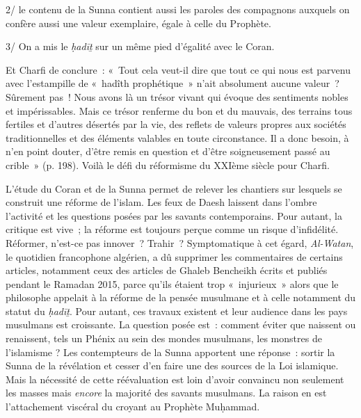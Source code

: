 2/ le contenu de la Sunna contient aussi les paroles des compagnons
auxquels on confère aussi une valeur exemplaire, égale à celle du
Prophète.

3/ On a mis le \emph{ḥadīṯ} sur un même pied d'égalité avec le Coran.

Et Charfi de conclure~: «~Tout cela veut-il dire que tout ce qui nous
est parvenu avec l'estampille de «~hadîth prophétique~» n'ait absolument
aucune valeur~? Sûrement pas~! Nous avons là un trésor vivant qui évoque
des sentiments nobles et impérissables. Mais ce trésor renferme du bon
et du mauvais, des terrains tous fertiles et d'autres désertés par la
vie, des reflets de valeurs propres aux sociétés traditionnelles et des
éléments valables en toute circonstance. Il a donc besoin, à n'en point
douter, d'être remis en question et d'être soigneusement passé au
crible~» (p. 198). Voilà le défi du réformisme du XXIème siècle pour
Charfi.


L'étude du Coran et de la Sunna permet de relever les chantiers sur
lesquels se construit une réforme de l'islam. Les feux de Daesh laissent
dans l'ombre l'activité et les questions posées par les savants
contemporains. Pour autant, la critique est vive~; la réforme est
toujours perçue comme un risque d'infidélité. Réformer, n'est-ce pas
innover~? Trahir~? Symptomatique à cet égard, \emph{Al-Watan}, le
quotidien francophone algérien, a dû supprimer les commentaires de
certains articles, notamment ceux des articles de Ghaleb Bencheikh
écrits et publiés pendant le Ramadan 2015, parce qu'ils étaient trop
«~injurieux~» alors que le philosophe appelait à la réforme de la pensée
musulmane et à celle notamment du statut du \emph{ḥadīṯ}. Pour autant,
ces travaux existent et leur audience dans les pays musulmans est
croissante. La question posée est~: comment éviter que naissent ou
renaissent, tels un Phénix au sein des mondes musulmans, les monstres de
l'islamisme ? Les contempteurs de la Sunna apportent une réponse~:
sortir la Sunna de la révélation et cesser d'en faire une des sources de
la Loi islamique. Mais la nécessité de cette réévaluation est loin
d'avoir convaincu non seulement les masses mais \emph{encore} la
majorité des savants musulmans. La raison en est l'attachement viscéral
du croyant au Prophète Muḥammad.

